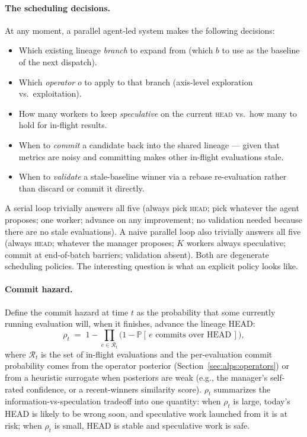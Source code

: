 \documentclass{article}
\newcommand{\HEAD}{\textsc{head}\xspace}
\begin{document}
\paragraph{The scheduling decisions.}
At any moment, a parallel agent-led system makes the following decisions:

\begin{itemize}[leftmargin=*,nosep]
\item Which existing lineage \emph{branch} to expand from (which $b$ to use as the baseline of the next dispatch).
\item Which \emph{operator} $o$ to apply to that branch (axis-level exploration vs.\ exploitation).
\item How many workers to keep \emph{speculative} on the current \HEAD vs.\ how many to hold for in-flight results.
\item When to \emph{commit} a candidate back into the shared lineage — given that metrics are noisy and committing makes other in-flight evaluations stale.
\item When to \emph{validate} a stale-baseline winner via a rebase re-evaluation rather than discard or commit it directly.
\end{itemize}

A serial loop trivially answers all five (always pick \HEAD; pick whatever the agent proposes; one worker; advance on any improvement; no validation needed because there are no stale evaluations). A naive parallel loop also trivially answers all five (always \HEAD; whatever the manager proposes; $K$ workers always speculative; commit at end-of-batch barriers; validation absent). Both are degenerate scheduling policies. The interesting question is what an explicit policy looks like.

\paragraph{Commit hazard.}
Define the commit hazard at time $t$ as the probability that some currently running evaluation will, when it finishes, advance the lineage HEAD:
\begin{equation}
  \rho_t \;=\; 1 - \prod_{e \in \mathcal{R}_t} \bigl(1 - \mathbb{P}\!\left[\,e \text{ commits over HEAD}\,\right]\bigr),
  \label{eq:hazard}
\end{equation}
where $\mathcal{R}_t$ is the set of in-flight evaluations and the per-evaluation commit probability comes from the operator posterior (Section~\ref{sec:alps:operators}) or from a heuristic surrogate when posteriors are weak (e.g., the manager's self-rated confidence, or a recent-winners similarity score). $\rho_t$ summarizes the information-vs-speculation tradeoff into one quantity: when $\rho_t$ is large, today's HEAD is likely to be wrong soon, and speculative work launched from it is at risk; when $\rho_t$ is small, HEAD is stable and speculative work is safe.
\end{document}
